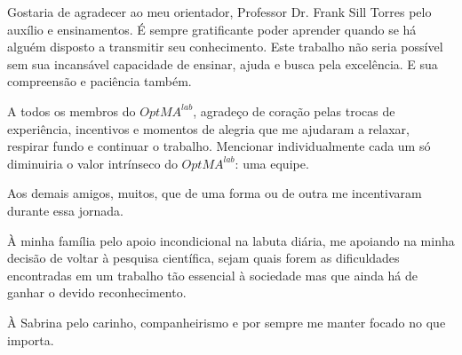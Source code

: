 \begin{agradecimentos}
Gostaria de agradecer ao meu orientador, Professor Dr. Frank Sill Torres pelo auxílio e ensinamentos. É sempre gratificante poder aprender quando se há alguém disposto a transmitir seu conhecimento. Este trabalho não seria possível sem sua incansável capacidade de ensinar, ajuda e busca pela excelência. E sua compreensão e paciência também.

A todos os membros do $OptMA^{lab}$, agradeço de coração pelas trocas de experiência, incentivos e momentos de alegria que me ajudaram a relaxar, respirar fundo e continuar o trabalho. Mencionar individualmente cada um só diminuiria o valor intrínseco do $OptMA^{lab}$: uma equipe.

Aos demais amigos, muitos, que de uma forma ou de outra me incentivaram durante essa jornada.

À minha família pelo apoio incondicional na labuta diária, me apoiando na minha decisão de voltar à pesquisa científica, sejam quais forem as dificuldades encontradas em um trabalho tão essencial à sociedade mas que ainda há de ganhar o devido reconhecimento.

À Sabrina pelo carinho, companheirismo e por sempre me manter focado no que importa.
\end{agradecimentos}
